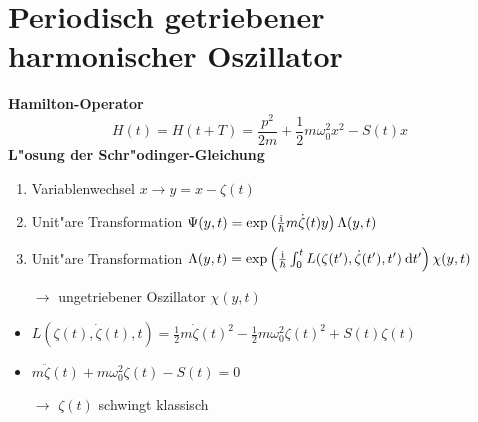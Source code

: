 \section{Periodisch getriebener harmonischer Oszillator}
\begin{frame}
  \textbf{Hamilton-Operator}
  \begin{equation} %
    H(t) = H(t+T) = \frac{p^2}{2m} + \frac{1}{2}m\omega_0^2x^2-S(t)x
  \end{equation}
  \textbf{L"osung der Schr"odinger-Gleichung}
  \begin{enumerate}
    \item Variablenwechsel $x \rightarrow y=x-\zeta(t)$ %
    \item Unit"are Transformation $\Psi(y,t) = \exp\left(\frac{\text i}{\hbar}m\dot \zeta(t) y\right)\Lambda(y,t)$
    \item Unit"are Transformation  $\Lambda(y,t) = \exp\left(\frac{\text i}{\hbar}\int_0^tL(\zeta(t'),\dot \zeta(t'), t') \: \text d t'\right)\chi(y,t)$

    $\rightarrow$ ungetriebener Oszillator $\chi(y,t)$
  \end{enumerate}

  \begin{itemize}
    \item $L(\zeta(t),\dot \zeta(t), t) = \frac{1}{2}m\dot \zeta(t)^2 - \frac{1}{2}m\omega_0^2\zeta(t)^2 + S(t)\zeta(t)$
    \item   $m\ddot \zeta(t) + m\omega_0^2\zeta(t) - S(t) = 0$

    $\rightarrow$ $\zeta(t)$ schwingt klassisch
  \end{itemize}
\end{frame}

